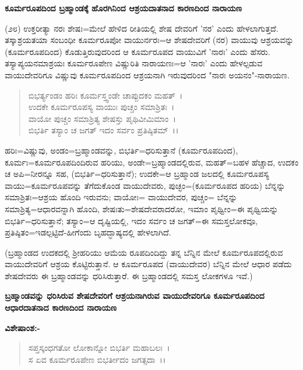 \begin{center}
\textbf{ಕೂರ್ಮರೂಪದಿಂದ ಬ್ರಹ್ಮಾಂಡಕ್ಕೆ ಹೊರಗಿನಿಂದ ಆಶ್ರಯದಾತನಾದ ಕಾರಣದಿಂದ ನಾರಾಯಣ}
\end{center}

(೨೮) ಉಕ್ತರೀತ್ಯಾ ನರಃ ಶೇಷಃ=ಮೇಲೆ ಹೇಳಿದ ರೀತಿಯಲ್ಲಿ ಶೇಷ ದೇವರಿಗೆ 'ನರ' ಎಂದು ಹೇಳಲಾಗುತ್ತದೆ. ತಸ್ಕಾಶ್ರಯತಯಾ ಸಂಬಂಧೀ ಕೂರ್ಮರೂಪೋ ವಾಯುರ್ನರಃ=ಆ ಶೇಷದೇವರಿಗೆ (ನರ) ವಾಯುವು ಆಶ್ರಯವನ್ನು (ಕೂರ್ಮರೂಪದಿಂದ) ಕೊಡುತ್ತಿರುವುದರಿಂದ ಆ ಕೂರ್ಮರೂಪದ ವಾಯುವಿಗೆ 'ನಾರಃ' ಎಂದು ಹೆಸರು. ತಸ್ಯಾಪ್ಯಯನಮಾಶ್ರಯಃ ಕೂರ್ಮರೂಪೇಣ ವಿಷ್ಣುರಿತಿ ನಾರಾಯಣಃ=ಆ 'ನಾರಃ' ಎಂದು ಹೇಳಲ್ಪಡುವ ವಾಯುದೇವರಿಗೂ ವಿಷ್ಣುವು ಕೂರ್ಮರೂಪದಿಂದ ಆಶ್ರಯನಾಗಿ ಇರುವುದರಿಂದ "ನಾರಃ ಅಯನಂ"-ನಾರಾಯಣ.

\begin{verse}
ಬಿಭರ್ತ್ಯಂಡಂ ಹರಿಃ ಕೂರ್ಮಸ್ತ್ವಂಡೇ ಚಾಪ್ಪುದಕಂ ಮಹತ್~।\\ ಉದಕೇ ಕೂರ್ಮರೂಪಸ್ಯ ವಾಯುಃ ಪುಚ್ಚಂ ಸಮಾಶ್ರಿತಃ~।\\ ವಾಯೋ ಪುಚ್ಚಂ ಸಮಾಶ್ರಿತ್ಯ ಶೇಷಸ್ತು ಪೃಥಿವೀಮಿಮಾಂ~।\\ ಬಿಭರ್ತಿ ತಸ್ಯಾಂ ಚ ಜಗತ್ ಇದಂ ಸರ್ವಂ ಪ್ರತಿಷ್ಠಿತಮ್~।।
\end{verse}

ಹರಿಃ=ವಿಷ್ಣುವು, ಅಂಡಂ=ಬ್ರಹ್ಮಾಂಡವನ್ನು, ಬಿಭರ್ತಿ=ಧರಿಸುತ್ತಾನೆ (ಕೂರ್ಮರೂಪದಿಂದ), ಕೂರ್ಮಃ=ಕೂರ್ಮರೂಪದಿಂದಿರುವ ಹರಿಯು, ಅಂಡೇ=ಬ್ರಹ್ಮಾಂಡದಲ್ಲಿರುವ, ಮಹತ್=ಬಹಳ ಹೆಚ್ಚಾದ, ಉದಕಂ ಚ ಅಪಿ=ನೀರನ್ನೂ ಸಹ, (ಬಿಭರ್ತಿ=ಧರಿಸುತ್ತಾನೆ); ಉದಕೇ=ಆ ಬ್ರಹ್ಮಾಂಡ ಜಲದಲ್ಲಿ ಕೂರ್ಮರೂಪಸ್ಯ ವಾಯು=ಕೂರ್ಮರೂಪವನ್ನು ತೆಗೆದುಕೊಂಡ ವಾಯುದೇವರು, ಪುಚ್ಛಂ=(ಕೂರ್ಮರೂಪದ ಹರಿಯ) ಬೆನ್ನನ್ನು ಸಮಾಶ್ರಿತಃ=ಆಶ್ರಯ ಹೊಂದಿ ಇರುವನು; ವಾಯೋಃ= ವಾಯುದೇವರ, ಪುಚ್ಚಂ= ಬೆನ್ನನ್ನು ಸಮಾಶ್ರಿತ್ಯ=ಆಧಾರವನ್ನಾಗಿ ಹೊಂದಿ, ಶೇಷಃತು=ಶೇಷದೇವರಾದರೋ, ಇಮಾಂ ಪೃಥ್ವೀಂ=ಈ ಪೃಥ್ವಿಯನ್ನು ಬಿಭರ್ತಿ=ಧರಿಸುತ್ತಾನೆ; ತಸ್ಯಾಂ=ಆ ದೃಷ್ಟಿಯಲ್ಲಿ, ಇದಂ ಸರ್ವಂ ಚ ಜಗತ್=ಈ ಸಮಸ್ತಲೋಕವೂ, ಪ್ರತಿಷ್ಠಿತಂ=ಇಡಲ್ಪಟ್ಟಿದೆ-ಹೀಗೆಂದು ಬೃಹದ್ಭಾಷ್ಯದಲ್ಲಿ ಹೇಳಲಾಗಿದೆ.

(ಬ್ರಹ್ಮಾಂಡದ ಉದಕದಲ್ಲಿ ಶ‍್ರೀಹರಿಯು ಆಮೆಯ ರೂಪದಿಂದಿದ್ದು ತನ್ನ ಬೆನ್ನಿನ ಮೇಲೆ ಕೂರ್ಮರೂಪದಲ್ಲಿರುವ ವಾಯುದೇವರಿಗೆ ಆಶ್ರಯ ಕೊಟ್ಟಿರುತ್ತಾನೆ. ಆ ಕೂರ್ಮರೂಪದ (ವಾಯುದೇವರ) ಬೆನ್ನಿನ ಮೇಲೆ ಆಧಾರ ಪಡೆದು ಶೇಷದೇವರು ಈ ಬ್ರಹ್ಮಾಂಡವನ್ನು ಧರಿಸಿರುತ್ತಾರೆ. ಈ ಬ್ರಹ್ಮಾಂಡದಲ್ಲಿ ಸಮಸ್ತ ಲೋಕಗಳೂ ಇವೆ.)

\begin{center}
\textbf{ಬ್ರಹ್ಮಾಂಡವನ್ನು ಧರಿಸಿರುವ ಶೇಷದೇವರಿಗೆ ಆಶ್ರಯನಾಗಿರುವ ವಾಯುದೇವರಿಗೂ ಕೂರ್ಮರೂಪದಿಂದ ಆಧಾರದಾತನಾದ ಕಾರಣದಿಂದ ನಾರಾಯಣ}
\end{center}

\noindent
\textbf{ವಿಶೇಷಾಂಶ:-}

\begin{verse}
ಸಪ್ತಸ್ಕಂಧಗತೋ ಲೋಕಾನ್ನೋ ಬಿಭರ್ತಿ ಮಹಾಬಲಃ~।\\ ಸ ಏವ ಕೂರ್ಮರೂಪೇಣ ಬಿಭರ್ತೀದಂ ಜಗತ್ಸದಾ~।।
\end{verse}


